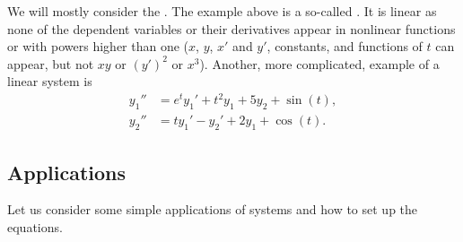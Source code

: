 We will mostly consider the \emph{}.  The example
above is a so-called \emph{}.
It is linear as none of the dependent variables or their derivatives
appear in nonlinear functions or with powers
higher than one ($x$, $y$, $x'$ and $y'$, constants, and functions of $t$
can appear, but not $xy$ or ${(y')}^2$ or $x^3$).  Another, more
complicated, example of a linear system is
\begin{align*}
y_1'' &= e^t y_1' + t^2 y_1 + 5 y_2 + \sin(t), \\
y_2'' &= t y_1'-y_2' + 2 y_1 + \cos(t).
\end{align*}

\subsection{Applications}

Let us consider some simple applications of systems and how to set up the
equations.

